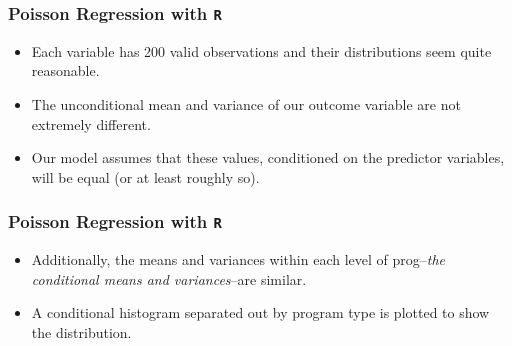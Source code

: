 \documentclass[00-GLMregslides.tex]{subfiles}
\begin{document}
\begin{frame}[fragile]

\frametitle{Poisson Regression with \texttt{R}}
\Large

\begin{itemize}
\item Each variable has 200 valid observations and their distributions seem quite reasonable. 
\item The unconditional mean and variance of our outcome variable are not extremely different. 
\item Our model assumes that these values, conditioned on the predictor variables, will be equal (or at least roughly so).
\end{itemize}
\end{frame}
\begin{frame}[fragile]
\frametitle{Poisson Regression with \texttt{R}}
\Large
\begin{itemize}
\item Additionally, the means and variances within each level of prog--\textit{the conditional means and variances}--are similar. 
\item A conditional histogram separated out by program type is plotted to show the distribution.
\end{itemize}


\end{frame}

%
%
%
%
%
		
\end{document}
